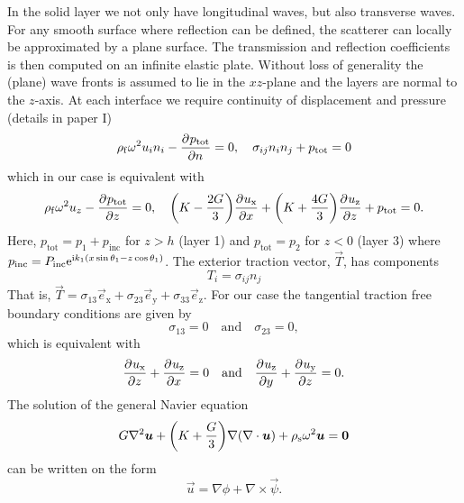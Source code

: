 In the solid layer we not only have longitudinal waves, but also transverse waves. For any smooth surface where reflection can be defined, the scatterer can locally be approximated by a plane surface. The transmission and reflection coefficients is then computed on an infinite elastic plate. Without loss of generality the (plane) wave fronts is assumed to lie in the $xz$-plane and the layers are normal to the $z$-axis.
At each interface we require continuity of displacement and pressure (details in paper I)
\begin{equation*}
	\rho_{\mathrm{f}} \omega^2 u_i n_i - \frac{\partial^{}p_{\mathrm{tot}}}{\partial n^{}} = 0,\quad\sigma_{ij}n_i n_j + p_{\mathrm{tot}} = 0
\end{equation*}
which in our case is equivalent with 
\begin{equation}\label{Eq:BCs}
	\rho_{\mathrm{f}} \omega^2 u_z - \pderiv{p_{\mathrm{tot}}}{z} = 0,\quad
	\left(K-\frac{2G}{3}\right)\pderiv{u_{\mathrm{x}}}{x} + \left(K+\frac{4G}{3}\right)\pderiv{u_{\mathrm{z}}}{z} + p_{\mathrm{tot}} = 0.
\end{equation}
Here, $p_{\mathrm{tot}} = p_1 + p_{\mathrm{inc}}$ for $z > h$ (layer 1) and $p_{\mathrm{tot}} = p_2$ for $z < 0$ (layer 3) where $p_{\mathrm{inc}} = P_{\mathrm{inc}}\mathrm{e}^{\mathrm{i} k_1(x\sin\theta_1 - z\cos\theta_1)}$. The exterior traction vector, $\vec{T}$, has components
\begin{equation*}
	T_i = \sigma_{ij}n_j
\end{equation*}
That is, $\vec{T} = \sigma_{13}\vec{e}_{\mathrm{x}} + \sigma_{23}\vec{e}_{\mathrm{y}} + \sigma_{33}\vec{e}_{\mathrm{z}}$. For our case the tangential traction free boundary conditions are given by
\begin{equation*}
	\sigma_{13} = 0\quad\text{and}\quad \sigma_{23} = 0,
\end{equation*}
which is equivalent with
\begin{equation}\label{Eq:tractionFreeBC}
	\frac{\partial^{}u_{\mathrm{x}}}{\partial z^{}} + \frac{\partial^{}u_{\mathrm{z}}}{\partial x^{}} = 0\quad\text{and}\quad \frac{\partial^{}u_{\mathrm{z}}}{\partial y^{}} + \frac{\partial^{}u_{\mathrm{y}}}{\partial z^{}} = 0.
\end{equation}
The solution of the general Navier equation
\begin{equation*}
	G\nabla^2\vec{u}+\left(K+\frac{G}{3}\right)\nabla(\nabla \cdot\vec{u}) +\rho_{\mathrm{s}}\omega^2\vec{u} = \zerovec
\end{equation*}
can be written on the form
\begin{equation*}
	\vec{u} = \nabla\phi + \nabla\times\vec{\psi}.
\end{equation*}
